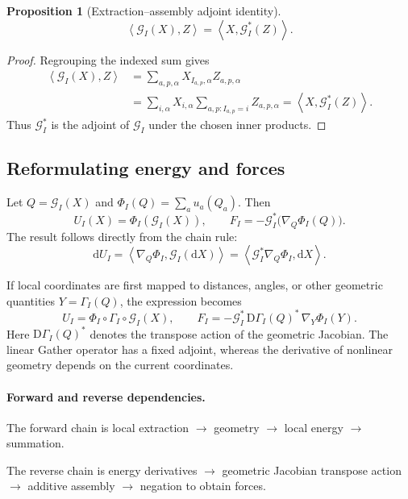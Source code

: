 \documentclass[11pt,a4paper]{article}
\newcommand{\dd}{\mathrm d}
\newcommand{\ip}[2]{\left\langle #1,#2\right\rangle}
\newcommand{\GE}{\mathcal G_I}
\newtheorem{proposition}{Proposition}[section]
\theoremstyle{definition}
\begin{document}
\begin{proposition}[Extraction--assembly adjoint identity]
\begin{equation}
\ip{\GE(X)}{Z}=\ip{X}{\GE^*(Z)}.
\label{eq:adjoint-identity}
\end{equation}
\end{proposition}
\begin{proof}
Regrouping the indexed sum gives
\begin{align}
\ip{\GE(X)}{Z}
&=\sum_{a,p,\alpha}X_{I_{a,p},\alpha}Z_{a,p,\alpha}\\
&=\sum_{i,\alpha}X_{i,\alpha}
\sum_{a,p:I_{a,p}=i}Z_{a,p,\alpha}
=\ip{X}{\GE^*(Z)}.\nonumber
\end{align}
Thus $\GE^*$ is the adjoint of $\GE$ under the chosen inner products.
\end{proof}

\subsection{Reformulating energy and forces}
Let $Q=\GE(X)$ and $\Phi_I(Q)=\sum_a u_a(Q_a)$. Then
\begin{equation}
U_I(X)=\Phi_I(\GE(X)),\qquad
F_I=-\GE^*\bigl(\nabla_Q\Phi_I(Q)\bigr).
\label{eq:local-reform}
\end{equation}
The result follows directly from the chain rule:
\begin{equation}
\dd U_I=\ip{\nabla_Q\Phi_I}{\GE(\dd X)}
=\ip{\GE^*\nabla_Q\Phi_I}{\dd X}.
\end{equation}

If local coordinates are first mapped to distances, angles, or other geometric quantities
$Y=\Gamma_I(Q)$, the expression becomes
\begin{equation}
U_I=\Phi_I\circ\Gamma_I\circ\GE(X),\qquad
F_I=-\GE^*\,\mathrm D\Gamma_I(Q)^*\,
\nabla_Y\Phi_I(Y).
\label{eq:geometry-chain}
\end{equation}
Here $\mathrm D\Gamma_I(Q)^*$ denotes the transpose action of the geometric Jacobian. The linear
Gather operator has a fixed adjoint, whereas the derivative of nonlinear geometry depends on the
current coordinates.


\paragraph{Forward and reverse dependencies.}
The forward chain is local extraction $\to$ geometry $\to$ local energy $\to$ summation.

The reverse chain is energy derivatives $\to$ geometric Jacobian transpose action $\to$ additive
assembly $\to$ negation to obtain forces.
\end{document}

